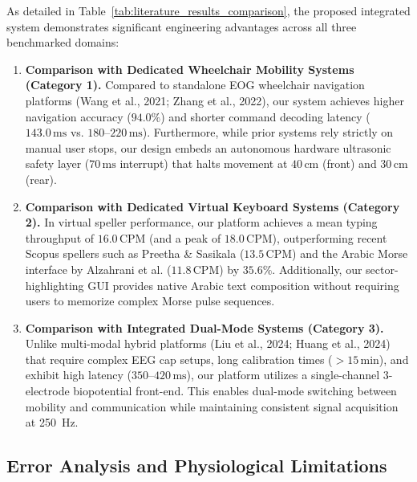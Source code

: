 As detailed in Table~\ref{tab:literature_results_comparison}, the proposed integrated system demonstrates significant engineering advantages across all three benchmarked domains:

\begin{enumerate}

  \item \textbf{Comparison with Dedicated Wheelchair Mobility Systems (Category 1).}
  Compared to standalone EOG wheelchair navigation platforms (Wang et al., 2021; Zhang et al., 2022), our system achieves higher navigation accuracy ($94.0\%$) and shorter command decoding latency ($143.0\,\text{ms}$ vs. $180\text{--}220\,\text{ms}$). Furthermore, while prior systems rely strictly on manual user stops, our design embeds an autonomous hardware ultrasonic safety layer ($70\,\text{ms}$ interrupt) that halts movement at $40\,\text{cm}$ (front) and $30\,\text{cm}$ (rear).

  \item \textbf{Comparison with Dedicated Virtual Keyboard Systems (Category 2).}
  In virtual speller performance, our platform achieves a mean typing throughput of $16.0\,\text{CPM}$ (and a peak of $18.0\,\text{CPM}$), outperforming recent Scopus spellers such as Preetha \& Sasikala ($13.5\,\text{CPM}$) and the Arabic Morse interface by Alzahrani et al. ($11.8\,\text{CPM}$) by $35.6\%$. Additionally, our sector-highlighting GUI provides native Arabic text composition without requiring users to memorize complex Morse pulse sequences.

  \item \textbf{Comparison with Integrated Dual-Mode Systems (Category 3).}
  Unlike multi-modal hybrid platforms (Liu et al., 2024; Huang et al., 2024) that require complex EEG cap setups, long calibration times ($>15\,\text{min}$), and exhibit high latency ($350\text{--}420\,\text{ms}$), our platform utilizes a single-channel 3-electrode biopotential front-end. This enables dual-mode switching between mobility and communication while maintaining consistent signal acquisition at 250~Hz.

\end{enumerate}

\FloatBarrier
\subsection{Error Analysis and Physiological Limitations}
\label{subsec:error_analysis_physiological_limitations}

